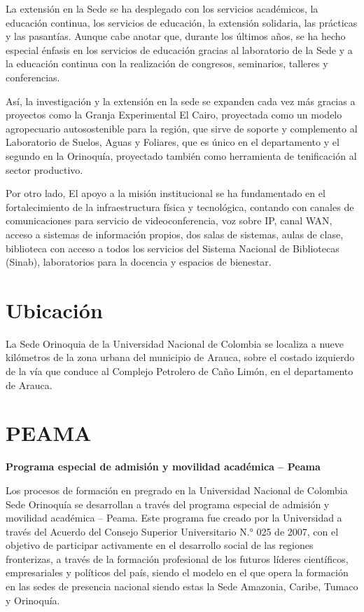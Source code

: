\documentclass[
]{book}
\begin{document}
La extensión en la Sede se ha desplegado con los servicios académicos, la educación continua, los servicios de educación, la extensión solidaria, las prácticas y las pasantías. Aunque cabe anotar que, durante los últimos años, se ha hecho especial énfasis en los servicios de educación gracias al laboratorio de la Sede y a la educación continua con la realización de congresos, seminarios, talleres y conferencias.

Así, la investigación y la extensión en la sede se expanden cada vez más gracias a proyectos como la Granja Experimental El Cairo, proyectada como un modelo agropecuario autosostenible para la región, que sirve de soporte y complemento al Laboratorio de Suelos, Aguas y Foliares, que es único en el departamento y el segundo en la Orinoquía, proyectado también como herramienta de tenificación al sector productivo.

Por otro lado, El apoyo a la misión institucional se ha fundamentado en el fortalecimiento de la infraestructura física y tecnológica, contando con canales de comunicaciones para servicio de videoconferencia, voz sobre IP, canal
WAN, acceso a sistemas de información propios, dos salas de sistemas, aulas de clase, biblioteca con acceso a todos los servicios del Sistema Nacional de Bibliotecas (Sinab), laboratorios para la docencia y espacios de bienestar.

\hypertarget{ubica}{%
\section*{Ubicación}\label{ubica}}

La Sede Orinoquia de la Universidad Nacional de Colombia se localiza a nueve kilómetros de la zona urbana del municipio de Arauca, sobre el costado izquierdo de la vía que conduce al Complejo Petrolero de Caño Limón, en el departamento de Arauca.

\hypertarget{peama}{%
\section*{PEAMA}\label{peama}}

\textbf{Programa especial de admisión y movilidad académica -- Peama}

Los procesos de formación en pregrado en la Universidad Nacional de Colombia Sede Orinoquía se desarrollan a través del programa especial de admisión y movilidad académica -- Peama. Este programa fue creado por la Universidad a través del Acuerdo del Consejo Superior Universitario N.° 025 de 2007, con el objetivo de participar activamente en el desarrollo social de las regiones fronterizas, a través de la formación profesional de los futuros líderes científicos, empresariales y políticos del país, siendo el modelo en el que opera la formación en las sedes de presencia nacional siendo estas la Sede Amazonia, Caribe, Tumaco y Orinoquía.
\end{document}
